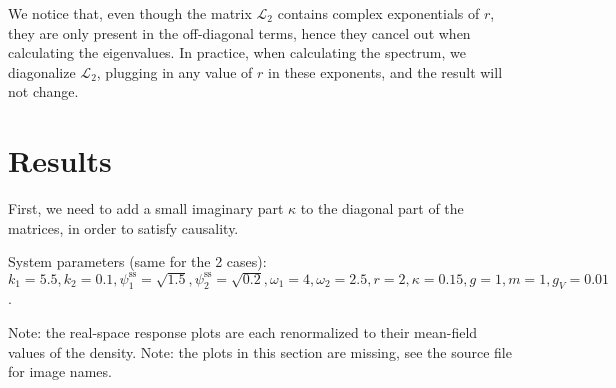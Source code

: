 \documentclass[12pt]{article}
\begin{document}
We notice that, even though the matrix $\mathcal{L}_2$ contains complex exponentials of $r$, they are only present in the off-diagonal terms, hence they cancel out when calculating the eigenvalues. In practice, when calculating the spectrum, we diagonalize $\mathcal{L}_2$, plugging in any value of $r$ in these exponents, and the result will not change.

\section{Results}
First, we need to add a small imaginary part $\kappa$ to the diagonal part of the matrices, in order to satisfy causality. 

System parameters (same for the 2 cases): $k_1=5.5, k_2=0.1, \psi_{1}^{\text{ss}}=\sqrt{1.5}, \psi_{2}^{\text{ss}}=\sqrt{0.2}, \omega_1=4, \omega_2=2.5, r=2, \kappa=0.15, g=1, m=1, g_V=0.01$.

Note: the real-space response plots are each renormalized to their mean-field values of the density.
Note: the plots in this section are missing, see the source file for image names.


\end{document}
